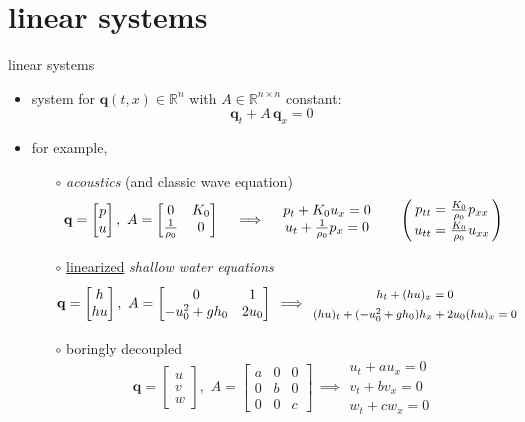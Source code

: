 \documentclass[10pt,hyperref]{beamer}
\newcommand{\bq}{\mathbf{q}}
\newcommand{\RR}{\mathbb{R}}
\begin{document}
\section{linear systems}

\begin{frame}{linear systems}

\begin{itemize}
\item system for $\bq(t,x) \in \RR^n$ with $A\in\RR^{n\times n}$ constant:
  $$\bq_t + A\, \bq_x=0$$
\item for example,
    \begin{itemize}
    \item[$\circ$] \emph{acoustics} (and classic wave equation)
        $$\bq = \begin{bmatrix} p \\ u \end{bmatrix}, \,\, A = \begin{bmatrix} 0 & K_0 \\ \frac{1}{\rho_0} & 0 \end{bmatrix} \quad \implies \quad \begin{matrix} p_t + K_0 u_x = 0 \\ u_t + \frac{1}{\rho_0} p_x = 0 \end{matrix} \qquad \begin{pmatrix} \, {\large \strut} p_{tt} = \frac{K_0}{\rho_0} p_{xx}\, \\ \, {\large \strut} u_{tt} = \frac{K_0}{\rho_0} u_{xx}\, \end{pmatrix}$$
    \item[$\circ$] \underline{linearized} \emph{shallow water equations}
        $$\bq = \begin{bmatrix} h \\ h u \end{bmatrix}, \,\, A = \begin{bmatrix} 0 & 1 \\ -u_0^2+gh_0 & 2 u_0 \end{bmatrix} \, \implies \, {\footnotesize \begin{matrix} {\large \strut} h_t + (hu)_x = 0 \\ {\large \strut} (h u)_t + (-u_0^2+gh_0) h_x + 2u_0 (h u)_x = 0 \end{matrix} }$$
    \item[$\circ$] boringly decoupled
        $$\bq = \begin{bmatrix} u \\ v \\ w \end{bmatrix}, \,\, A = \begin{bmatrix} a & 0 & 0 \\ 0 & b & 0 \\ 0 & 0 & c \end{bmatrix} \, \implies \begin{matrix} u_t + a u_x = 0 \\ v_t + b v_x = 0 \\ w_t + c w_x = 0 \end{matrix}$$
    \end{itemize}
\end{itemize}
\end{frame}
\end{document}
